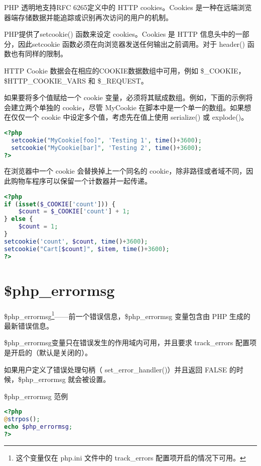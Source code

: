 PHP 透明地支持RFC 6265定义中的 HTTP cookies。Cookies 是一种在远端浏览器端存储数据并能追踪或识别再次访问的用户的机制。

PHP提供了setcookie() 函数来设定 cookies。Cookies 是 HTTP 信息头中的一部分，因此setcookie 函数必须在向浏览器发送任何输出之前调用。对于 header() 函数也有同样的限制。

HTTP Cookie 数据会在相应的COOKIE数据数组中可用，例如 \$\_COOKIE，\$HTTP\_COOKIE\_VARS 和 \$\_REQUEST。

如果要将多个值赋给一个 cookie 变量，必须将其赋成数组。例如，下面的示例将会建立两个单独的 cookie，尽管 MyCookie 在脚本中是一个单一的数组。如果想在仅仅一个 cookie 中设定多个值，考虑先在值上使用 serialize() 或 explode()。

\begin{lstlisting}[language=PHP]
<?php
  setcookie("MyCookie[foo]", 'Testing 1', time()+3600);
  setcookie("MyCookie[bar]", 'Testing 2', time()+3600);
?>
\end{lstlisting}

在浏览器中一个 cookie 会替换掉上一个同名的 cookie，除非路径或者域不同，因此购物车程序可以保留一个计数器并一起传递。

\begin{lstlisting}[language=PHP]
<?php
if (isset($_COOKIE['count'])) {
    $count = $_COOKIE['count'] + 1;
} else {
    $count = 1;
}
setcookie('count', $count, time()+3600);
setcookie("Cart[$count]", $item, time()+3600);
?>
\end{lstlisting}


\section{\$php\_errormsg}

\$php\_errormsg\footnote{这个变量仅在 php.ini 文件中的 track\_errors 配置项开启的情况下可用。}——前一个错误信息，\$php\_errormsg 变量包含由 PHP 生成的最新错误信息。

\$php\_errormsg变量只在错误发生的作用域内可用，并且要求 track\_errors 配置项是开启的（默认是关闭的）。

如果用户定义了错误处理句柄（ set\_error\_handler()）并且返回 FALSE 的时候，\$php\_errormsg 就会被设置。


\begin{example}
\$php\_errormsg 范例
\begin{lstlisting}[language=PHP]
<?php
@strpos();
echo $php_errormsg;
?>
\end{lstlisting}
\end{example}

